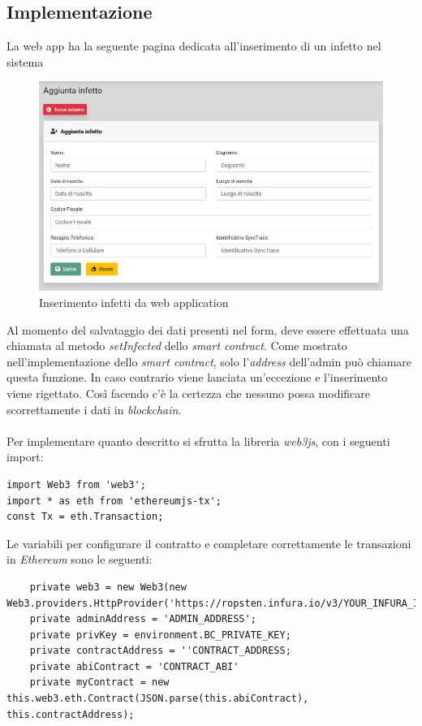 \subsection{Implementazione}
La web app ha la seguente pagina dedicata all'inserimento di un infetto nel sistema 
\begin{figure}[h]
\caption{Inserimento infetti da web application}
\centering
\includegraphics[width=1.0\textwidth]{./immagini/webapp_infected}
\end{figure}
\FloatBarrier

Al momento del salvataggio dei dati presenti nel form, deve essere effettuata una chiamata al metodo \textit{setInfected} dello \textit{smart contract}.
Come mostrato nell'implementazione dello \textit{smart contract}, solo l'\textit{address} dell'admin può chiamare questa funzione. In caso contrario viene lanciata un'eccezione e l'inserimento viene rigettato. Così facendo c'è la certezza che nessuno possa modificare scorrettamente i dati in \textit{blockchain}.\\\\

Per implementare quanto descritto si sfrutta la libreria \textit{web3js}, con i seguenti import:

\begin{lstlisting}
import Web3 from 'web3';
import * as eth from 'ethereumjs-tx';
const Tx = eth.Transaction;
\end{lstlisting}

Le variabili per configurare il contratto e completare correttamente le transazioni in \textit{Ethereum} sono le seguenti:
\begin{lstlisting}
    private web3 = new Web3(new Web3.providers.HttpProvider('https://ropsten.infura.io/v3/YOUR_INFURA_ID'));
    private adminAddress = 'ADMIN_ADDRESS';
    private privKey = environment.BC_PRIVATE_KEY;
    private contractAddress = ''CONTRACT_ADDRESS;
    private abiContract = 'CONTRACT_ABI'
    private myContract = new this.web3.eth.Contract(JSON.parse(this.abiContract), this.contractAddress);
\end{lstlisting}

